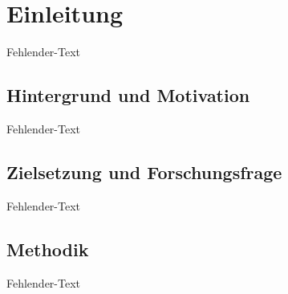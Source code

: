 \section{Einleitung}
Fehlender-Text

\subsection{Hintergrund und Motivation}
Fehlender-Text

\subsection{Zielsetzung und Forschungsfrage}
Fehlender-Text

\subsection{Methodik}
Fehlender-Text
